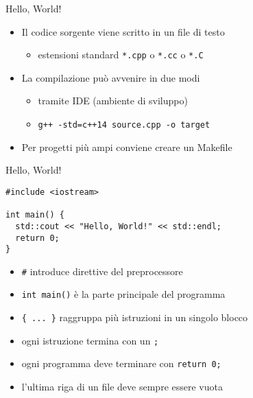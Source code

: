 \documentclass[xcolor=dvipsnames,handout]{beamer}
\begin{document}
\begin{frame}[fragile]{Hello, World!}
  \vfill
  \begin{itemize}
    \item Il codice sorgente viene scritto in un file di testo
    \begin{itemize}
      \item estensioni standard \lstinline$*.cpp$ o \lstinline$*.cc$ o \lstinline$*.C$
    \end{itemize}
    \vfill
    \item La compilazione può avvenire in due modi
    \begin{itemize}
      \item tramite IDE (ambiente di sviluppo)
      \item \lstinline$g++ -std=c++14 source.cpp -o target$
    \end{itemize}
    \vfill
    \item Per progetti più ampi conviene creare un \alert{Makefile}
  \end{itemize}
  \vfill
\end{frame}

\begin{frame}[fragile]{Hello, World!}
  \vfill
  \begin{lstlisting}
#include <iostream>

int main() {
  std::cout << "Hello, World!" << std::endl;
  return 0;
}
  \end{lstlisting}
  \vfill
  \begin{itemize}
    \item \lstinline$#$ introduce direttive del preprocessore
    \vfill
    \item \lstinline$int main()$ è la parte principale del programma
    \vfill
    \item \lstinline${ ... }$ raggruppa più istruzioni in un singolo blocco
    \vfill
    \item ogni istruzione termina con un \lstinline$;$
    \vfill
    \item ogni programma deve terminare con \lstinline$return 0;$
    \vfill
    \item l'ultima riga di un file deve sempre essere vuota
  \end{itemize}
  \vfill
\end{frame}
\end{document}
